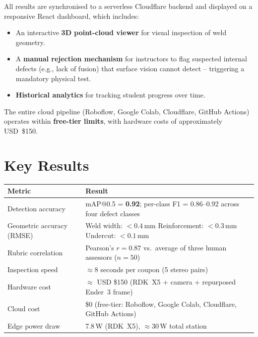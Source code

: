 \documentclass[11pt,a4paper]{article}
\begin{document}
All results are synchronised to a serverless Cloudflare backend and displayed on a responsive React
dashboard, which includes:
\begin{itemize}[leftmargin=1.5em, itemsep=3pt]
  \item An interactive \textbf{3D point-cloud viewer} for visual inspection of weld geometry.
  \item A \textbf{manual rejection mechanism} for instructors to flag suspected internal defects (e.g., lack
        of fusion) that surface vision cannot detect -- triggering a mandatory physical test.
  \item \textbf{Historical analytics} for tracking student progress over time.
\end{itemize}

The entire cloud pipeline (Roboflow, Google Colab, Cloudflare, GitHub Actions) operates within
\textbf{free-tier limits}, with hardware costs of approximately USD~\$150.

\section{Key Results}

\begin{center}
\begin{tabular}{L{5.5cm} L{9cm}}
  \toprule
  \textbf{Metric} & \textbf{Result} \\
  \midrule
  Detection accuracy & mAP@0.5 = \textbf{0.92}; per-class F1 = 0.86--0.92 across four defect classes \\
  \addlinespace
  Geometric accuracy (RMSE) &
    Weld width: $<0.4$\,mm \quad
    Reinforcement: $<0.3$\,mm \quad
    Undercut: $<0.1$\,mm \\
  \addlinespace
  Rubric correlation & Pearson's $r = 0.87$ vs.\ average of three human assessors ($n = 50$) \\
  \addlinespace
  Inspection speed   & $\approx 8$ seconds per coupon (5 stereo pairs) \\
  \addlinespace
  Hardware cost      & $\approx$ USD \$150 (RDK~X5 + camera + repurposed Ender~3 frame) \\
  \addlinespace
  Cloud cost         & \$0 (free-tier: Roboflow, Google Colab, Cloudflare, GitHub Actions) \\
  \addlinespace
  Edge power draw    & 7.8\,W (RDK~X5), $\approx$30\,W total station \\
  \bottomrule
\end{tabular}
\end{center}
\end{document}
